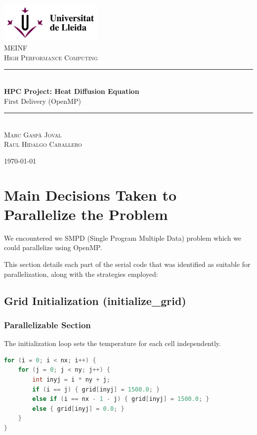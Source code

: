 \documentclass[12pt]{article}
\begin{document}
\begin{titlepage}
	\newcommand{\HRule}{\rule{\linewidth}{0.5mm}}

	\center

	\includegraphics[width=5cm]{logoudl.png}\\
	\textsc{\Large MEINF}\\[0.5cm]
	\textsc{\large High Performance Computing}\\[0.5cm]

	\HRule\\[0.4cm]

	{\huge\bfseries HPC Project: Heat Diffusion Equation}\\[0.4cm]
	{\LARGE First Delivery (OpenMP)}
	\HRule\\[1.5cm]

	\textsc{Marc Gaspà Joval\\Raul Hidalgo Caballero}

	\vfill\vfill\vfill
	{\large\today}
\end{titlepage}
\pagebreak
\thispagestyle{empty}
\tableofcontents
\pagebreak
\thispagestyle{empty}
\listoftables
\pagebreak

\section{Main Decisions Taken to Parallelize the Problem}

We encountered we SMPD (Single Program Multiple Data) problem which we could parallelize using OpenMP.

This section details each part of the serial code that was identified as suitable for parallelization, along with the strategies employed:

\subsection{Grid Initialization (initialize\_grid)}

\subsubsection{Parallelizable Section}
The initialization loop sets the temperature for each cell independently.
\begin{lstlisting}[language=C, basicstyle=\scriptsize\ttfamily]
for (i = 0; i < nx; i++) {
	for (j = 0; j < ny; j++) {
		int inyj = i * ny + j;
		if (i == j) { grid[inyj] = 1500.0; }
		else if (i == nx - 1 - j) { grid[inyj] = 1500.0; }
		else { grid[inyj] = 0.0; }
	}
}
\end{lstlisting}
\end{document}
